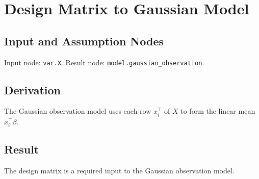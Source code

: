 \section{Design Matrix to Gaussian Model}
\label{edge:X-to-gaussian-model}

\subsection{Input and Assumption Nodes}
Input node: \texttt{var.X}. Result node: \texttt{model.gaussian\_observation}.

\subsection{Derivation}
The Gaussian observation model uses each row \(x_i^\top\) of \(X\) to form the linear mean \(x_i^\top\beta\).

\subsection{Result}
The design matrix is a required input to the Gaussian observation model.

